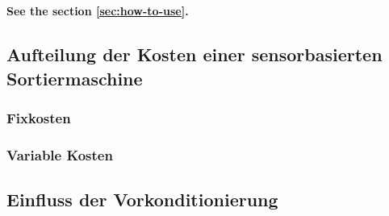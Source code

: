 \chapter{}
\label{sec:Kostenfaktoren}

\textbf{See the section \ref{sec:how-to-use}.}

\section{Aufteilung der Kosten einer sensorbasierten Sortiermaschine}
\subsection{Fixkosten}
\subsection{Variable Kosten}

\section{Einfluss der Vorkonditionierung}